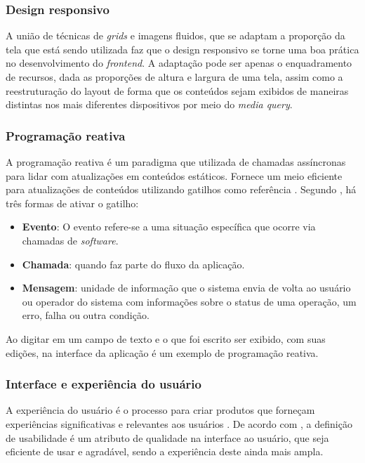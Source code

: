 \subsubsection{Design responsivo}
A união de técnicas de \textit{grids} e imagens fluidos, que se adaptam a proporção da tela que está sendo utilizada faz que o design responsivo se torne uma boa prática no desenvolvimento do \textit{frontend}. A adaptação pode ser apenas o enquadramento de recursos, dada as proporções de altura e largura de uma tela, assim como a reestruturação do layout de forma que os conteúdos sejam exibidos de maneiras distintas nos mais diferentes dispositivos por meio do \textit{media query}. \cite{MOZILA}

\subsubsection{Programação reativa}
A programação reativa é um paradigma que utilizada de chamadas assíncronas para lidar com atualizações em conteúdos estáticos. Fornece um meio eficiente para atualizações de conteúdos utilizando gatilhos como referência \cite{NOLLE}. Segundo , há três formas de ativar o gatilho:
\begin{itemize}
    \item \textbf{Evento}: O evento refere-se a uma situação específica que ocorre via chamadas de \textit{software}.
    \item \textbf{Chamada}: quando faz parte do fluxo da aplicação.
    \item \textbf{Mensagem}: unidade de informação que o sistema envia de volta ao usuário ou operador do sistema com informações sobre o status de uma operação, um erro, falha ou outra condição.
\end{itemize}

Ao digitar em um campo de texto e o que foi escrito ser exibido, com suas edições, na interface da aplicação é um exemplo de programação reativa.

\subsubsection{Interface e experiência do usuário}
A experiência do usuário é o processo para criar produtos que forneçam experiências significativas e relevantes aos usuários \cite{UX}. De acordo com , a definição de usabilidade é um atributo de qualidade na interface ao usuário, que seja eficiente de usar e agradável, sendo a experiência deste ainda mais ampla. 

